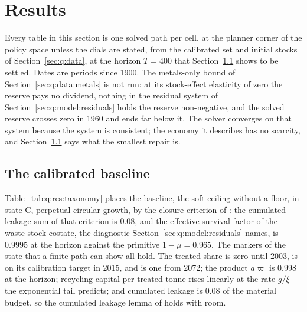 \section{Results}\label{sec:q:res}

Every table in this section is one solved path per cell, at the planner corner of the policy space unless the dials are stated, from the calibrated set and initial stocks of Section~\ref{sec:q:data}, at the horizon $T=400$ that Section~\ref{sec:q:res:baseline} shows to be settled. Dates are periods since 1900. The metals-only bound of Section~\ref{sec:q:data:metals} is not run: at its stock-effect elasticity of zero the reserve pays no dividend, nothing in the residual system of Section~\ref{sec:q:model:residuals} holds the reserve non-negative, and the solved reserve crosses zero in 1960 and ends far below it. The solver converges on that system because the system is consistent; the economy it describes has no scarcity, and Section~\ref{sec:q:res:baseline} says what the smallest repair is.

\subsection{The calibrated baseline}\label{sec:q:res:baseline}

 Table~\ref{tab:q:res:taxonomy} places the baseline, the soft ceiling without a floor, in state C, perpetual circular growth, by the closure criterion of : the cumulated leakage sum of that criterion is $0.08$, and the effective survival factor of the waste-stock costate, the diagnostic Section~\ref{sec:q:model:residuals} names, is $0.9995$ at the horizon against the primitive $1-\mu=0.965$. The markers of the state that a finite path can show all hold. The treated share is zero until 2003, is on its calibration target in 2015, and is one from 2072; the product $a\varpi$ is $0.998$ at the horizon; recycling capital per treated tonne rises linearly at the rate $g/\xi$ the exponential tail predicts; and cumulated leakage is $0.08$ of the material budget, so the cumulated leakage lemma of  holds with room.



